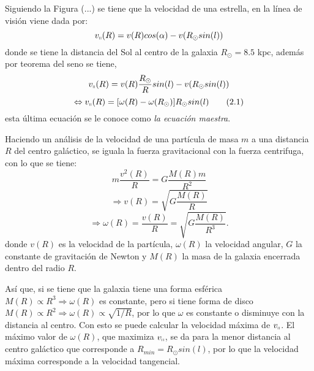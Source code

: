 \documentclass[letterpaper,oneside]{article}
\begin{document}


Siguiendo la Figura (...) se tiene que la velocidad de una estrella, en la línea de visión viene dada por:
\begin{equation*}
v_{\shortparallel}(R)=v(R)cos(\alpha)-v(R_{\odot}sin(l))
\end{equation*}
donde se tiene la distancia del Sol al centro de la galaxia $R_{\odot}=8.5$ kpc, además por teorema del seno se tiene,
\begin{equation*}
v_{\shortparallel}(R)=v(R)\frac{R_{\odot}}{R}sin(l)-v(R_{\odot}sin(l))\\
\end{equation*}
\[
\Leftrightarrow v_{\shortparallel}(R)=[\omega(R)-\omega(R_{\odot})]R_{\odot}sin(l) \tag{2.1} \label{eq:ec-maestra}
\]
esta última ecuación se le conoce como \textit{la ecuación maestra}.

Haciendo un análisis de la velocidad de una partícula de masa $m$ a una distancia $R$ del centro galáctico, se iguala la fuerza gravitacional con la fuerza centrifuga, con lo que se tiene:
\[
m\frac{v^2(R)}{R}=G\frac{M(R)m}{R^2}
\]
\[
 \Rightarrow v(R)=\sqrt{G\frac{M(R)}{R}} \tag{2.2} \label{eq:velocidad}
\]
\[
 \Rightarrow \omega(R)=\frac{v(R)}{R}=\sqrt{G\frac{M(R)}{R^3}}.  \tag{2.3} \label{eq:omega}
\]
donde $v(R)$ es la velocidad de la partícula, $\omega(R)$ la velocidad angular, $G$ la constante de gravitación de Newton y $M(R)$ la masa de la galaxia encerrada dentro del radio $R$.

Así que, si se tiene que la galaxia tiene una forma esférica $M(R) \propto R^3\Rightarrow\omega(R)$ es constante, pero si tiene forma de disco $M(R) \propto R^2\Rightarrow\omega(R)\propto \sqrt{1/R}$, por lo que $\omega$ es constante o disminuye con la distancia al centro. Con esto se puede calcular la velocidad máxima de $v_{\shortparallel}$. El máximo valor de  $\omega(R)$, que maximiza $v_{\shortparallel}$, se da para la menor distancia al centro galáctico que corresponde a $R_{min}=R_{\odot}sin(l)$, por lo que la velocidad máxima corresponde a la velocidad tangencial.
\end{document}

